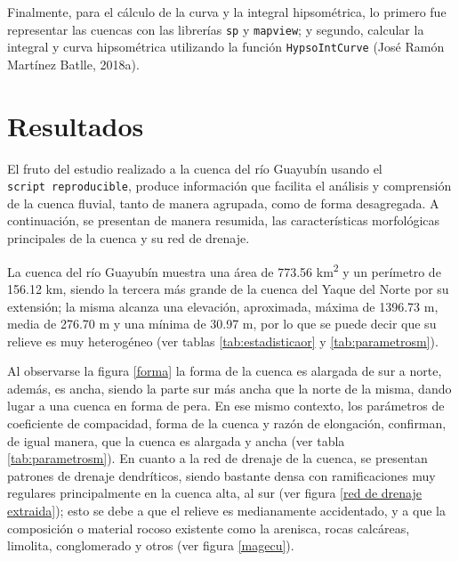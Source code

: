 \documentclass[11pt,]{article}
\begin{document}
Finalmente, para el cálculo de la curva y la integral hipsométrica, lo
primero fue representar las cuencas con las librerías \texttt{sp} y
\texttt{mapview}; y segundo, calcular la integral y curva hipsométrica
utilizando la función \texttt{HypsoIntCurve} (José Ramón Martínez
Batlle, 2018a).

\section{Resultados}\label{resultados}

El fruto del estudio realizado a la cuenca del río Guayubín usando el
\texttt{script\ reproducible}, produce información que facilita el
análisis y comprensión de la cuenca fluvial, tanto de manera agrupada,
como de forma desagregada. A continuación, se presentan de manera
resumida, las características morfológicas principales de la cuenca y su
red de drenaje.

La cuenca del río Guayubín muestra una área de 773.56
km\textsuperscript{2} y un perímetro de 156.12 km, siendo la tercera más
grande de la cuenca del Yaque del Norte por su extensión; la misma
alcanza una elevación, aproximada, máxima de 1396.73 m, media de 276.70
m y una mínima de 30.97 m, por lo que se puede decir que su relieve es
muy heterogéneo (ver tablas \ref{tab:estadisticaor} y
\ref{tab:parametrosm}).

Al observarse la figura \ref{forma} la forma de la cuenca es alargada de
sur a norte, además, es ancha, siendo la parte sur más ancha que la
norte de la misma, dando lugar a una cuenca en forma de pera. En ese
mismo contexto, los parámetros de coeficiente de compacidad, forma de la
cuenca y razón de elongación, confirman, de igual manera, que la cuenca
es alargada y ancha (ver tabla \ref{tab:parametrosm}). En cuanto a la
red de drenaje de la cuenca, se presentan patrones de drenaje
dendríticos, siendo bastante densa con ramificaciones muy regulares
principalmente en la cuenca alta, al sur (ver figura
\ref{red de drenaje extraida}); esto se debe a que el relieve es
medianamente accidentado, y a que la composición o material rocoso
existente como la arenisca, rocas calcáreas, limolita, conglomerado y
otros (ver figura \ref{magecu}).
\end{document}
